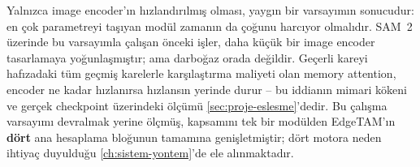 Yalnızca image encoder'ın hızlandırılmış olması, yaygın bir varsayımın
sonucudur: en çok parametreyi taşıyan modül zamanın da çoğunu harcıyor
olmalıdır. SAM~2 üzerinde bu varsayımla çalışan önceki işler, daha
küçük bir image encoder tasarlamaya yoğunlaşmıştır; ama darboğaz orada
değildir. Geçerli kareyi hafızadaki tüm geçmiş karelerle karşılaştırma
maliyeti olan memory attention, encoder ne kadar hızlanırsa hızlansın
yerinde durur -- bu iddianın mimari kökeni ve gerçek checkpoint
üzerindeki ölçümü \cref{sec:proje-eslesme}'dedir. Bu çalışma varsayımı
devralmak yerine ölçmüş, kapsamını tek bir modülden EdgeTAM'ın
\textbf{dört} ana hesaplama bloğunun tamamına genişletmiştir; dört
motora neden ihtiyaç duyulduğu \cref{ch:sistem-yontem}'de ele
alınmaktadır.
